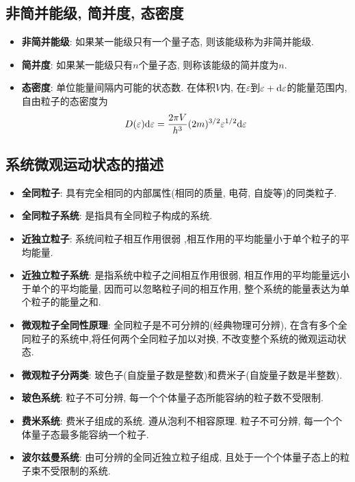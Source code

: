 \subsection{非简并能级, 简并度, 态密度}

\begin{itemize}
\item\textbf{非简并能级}: 如果某一能级只有一个量子态, 则该能级称为非简并能级.
\item\textbf{简并度}: 如果某一能级只有$n$个量子态, 则称该能级的简并度为$n$.
\item\textbf{态密度}: 单位能量间隔内可能的状态数. 在体积$V$内, 在$\varepsilon$到$\varepsilon+\mathrm{d} \varepsilon$的能量范围内, 自由粒子的态密度为
\[
D(\varepsilon) \mathrm{d} \varepsilon = \frac{2\pi V}{h^3}(2m)^{3/2}\varepsilon^{1/2}\mathrm{d} \varepsilon
\]
\end{itemize}



\subsection{系统微观运动状态的描述}
\begin{itemize}
\item\textbf{全同粒子}:  具有完全相同的内部属性(相同的质量, 电荷, 自旋等)的同类粒子.
\item\textbf{全同粒子系统}: 是指具有全同粒子构成的系统.
\item\textbf{近独立粒子}: 系统间粒子相互作用很弱 ,相互作用的平均能量小于单个粒子的平均能量.
\item\textbf{近独立粒子系统}: 是指系统中粒子之间相互作用很弱, 相互作用的平均能量远小于单个的平均能量, 因而可以忽略粒子间的相互作用, 整个系统的能量表达为单个粒子的能量之和.
\item\textbf{微观粒子全同性原理}: 全同粒子是不可分辨的(经典物理可分辨), 在含有多个全同粒子的系统中,将任何两个全同粒子加以对换, 不改变整个系统的微观运动状态.
\item\textbf{微观粒子分两类}: 玻色子(自旋量子数是整数)和费米子(自旋量子数是半整数). 
\item\textbf{玻色系统}: 粒子不可分辨, 每一个个体量子态所能容纳的粒子数不受限制.
\item\textbf{费米系统}: 费米子组成的系统. 遵从泡利不相容原理. 粒子不可分辨, 每一个个体量子态最多能容纳一个粒子.
\item\textbf{波尔兹曼系统}: 由可分辨的全同近独立粒子组成, 且处于一个个体量子态上的粒子束不受限制的系统.
\end{itemize}

